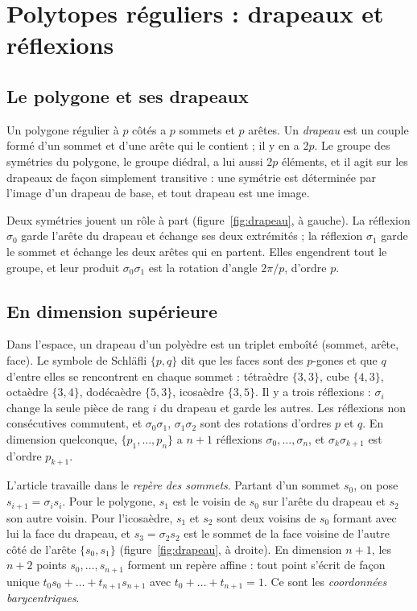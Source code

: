 \documentclass[11pt,a4paper]{amsart}
\theoremstyle{definition}
\theoremstyle{plain}
\theoremstyle{remark}
\begin{document}
\section{Polytopes réguliers : drapeaux et réflexions}

\subsection{Le polygone et ses drapeaux}

Un polygone régulier à $p$ côtés a $p$ sommets et $p$ arêtes. Un \emph{drapeau} est un couple formé d'un sommet et d'une arête qui le contient ; il y en a $2p$. Le groupe des symétries du polygone, le groupe diédral, a lui aussi $2p$ éléments, et il agit sur les drapeaux de façon simplement transitive : une symétrie est déterminée par l'image d'un drapeau de base, et tout drapeau est une image.

Deux symétries jouent un rôle à part (figure~\ref{fig:drapeau}, à gauche). La réflexion $\sigma_0$ garde l'arête du drapeau et échange ses deux extrémités ; la réflexion $\sigma_1$ garde le sommet et échange les deux arêtes qui en partent. Elles engendrent tout le groupe, et leur produit $\sigma_0\sigma_1$ est la rotation d'angle $2\pi/p$, d'ordre $p$.

\subsection{En dimension supérieure}

Dans l'espace, un drapeau d'un polyèdre est un triplet emboîté (sommet, arête, face). Le symbole de Schläfli $\{p, q\}$ dit que les faces sont des $p$-gones et que $q$ d'entre elles se rencontrent en chaque sommet : tétraèdre $\{3,3\}$, cube $\{4,3\}$, octaèdre $\{3,4\}$, dodécaèdre $\{5,3\}$, icosaèdre $\{3,5\}$. Il y a trois réflexions : $\sigma_i$ change la seule pièce de rang $i$ du drapeau et garde les autres. Les réflexions non consécutives commutent, et $\sigma_0\sigma_1$, $\sigma_1\sigma_2$ sont des rotations d'ordres $p$ et $q$. En dimension quelconque, $\{p_1, \dots, p_n\}$ a $n+1$ réflexions $\sigma_0, \dots, \sigma_n$, et $\sigma_k\sigma_{k+1}$ est d'ordre $p_{k+1}$.

L'article travaille dans le \emph{repère des sommets}. Partant d'un sommet $s_0$, on pose $s_{i+1} = \sigma_i s_i$. Pour le polygone, $s_1$ est le voisin de $s_0$ sur l'arête du drapeau et $s_2$ son autre voisin. Pour l'icosaèdre, $s_1$ et $s_2$ sont deux voisins de $s_0$ formant avec lui la face du drapeau, et $s_3 = \sigma_2 s_2$ est le sommet de la face voisine de l'autre côté de l'arête $\{s_0, s_1\}$ (figure~\ref{fig:drapeau}, à droite). En dimension $n+1$, les $n+2$ points $s_0, \dots, s_{n+1}$ forment un repère affine : tout point s'écrit de façon unique $t_0s_0 + \dots + t_{n+1}s_{n+1}$ avec $t_0 + \dots + t_{n+1} = 1$. Ce sont les \emph{coordonnées barycentriques}.
\end{document}
